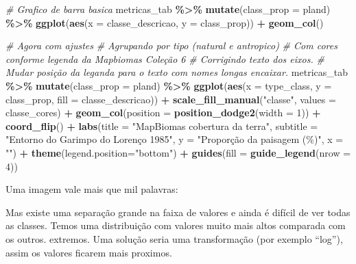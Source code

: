 \documentclass[
]{article}
\newenvironment{Shaded}{\begin{snugshade}}{\end{snugshade}}
\newcommand{\AttributeTok}[1]{\textcolor[rgb]{0.13,0.29,0.53}{#1}}
\newcommand{\CommentTok}[1]{\textcolor[rgb]{0.56,0.35,0.01}{\textit{#1}}}
\newcommand{\DecValTok}[1]{\textcolor[rgb]{0.00,0.00,0.81}{#1}}
\newcommand{\FunctionTok}[1]{\textcolor[rgb]{0.13,0.29,0.53}{\textbf{#1}}}
\newcommand{\NormalTok}[1]{#1}
\newcommand{\SpecialCharTok}[1]{\textcolor[rgb]{0.81,0.36,0.00}{\textbf{#1}}}
\newcommand{\StringTok}[1]{\textcolor[rgb]{0.31,0.60,0.02}{#1}}
\begin{document}
\begin{Shaded}
\begin{Highlighting}[]
\CommentTok{\# Grafico de barra basica}
\NormalTok{metricas\_tab }\SpecialCharTok{\%\textgreater{}\%} 
\FunctionTok{mutate}\NormalTok{(}\AttributeTok{class\_prop =}\NormalTok{ pland) }\SpecialCharTok{\%\textgreater{}\%} 
\FunctionTok{ggplot}\NormalTok{(}\FunctionTok{aes}\NormalTok{(}\AttributeTok{x =}\NormalTok{ classe\_descricao, }\AttributeTok{y =}\NormalTok{ class\_prop)) }\SpecialCharTok{+}
\FunctionTok{geom\_col}\NormalTok{()}


\CommentTok{\# Agora com ajustes}
\CommentTok{\# Agrupando por tipo (natural e antropico)}
\CommentTok{\# Com cores conforme legenda da Mapbiomas Coleção 6}
\CommentTok{\# Corrigindo texto dos eixos.}
\CommentTok{\# Mudar posição da leganda para o texto com nomes longas encaixar.}
\NormalTok{metricas\_tab }\SpecialCharTok{\%\textgreater{}\%} 
\FunctionTok{mutate}\NormalTok{(}\AttributeTok{class\_prop =}\NormalTok{ pland) }\SpecialCharTok{\%\textgreater{}\%} 
\FunctionTok{ggplot}\NormalTok{(}\FunctionTok{aes}\NormalTok{(}\AttributeTok{x =}\NormalTok{ type\_class, }\AttributeTok{y =}\NormalTok{ class\_prop, }
\AttributeTok{fill =}\NormalTok{ classe\_descricao)) }\SpecialCharTok{+} 
\FunctionTok{scale\_fill\_manual}\NormalTok{(}\StringTok{"classe"}\NormalTok{, }\AttributeTok{values =}\NormalTok{ classe\_cores) }\SpecialCharTok{+}
\FunctionTok{geom\_col}\NormalTok{(}\AttributeTok{position =} \FunctionTok{position\_dodge2}\NormalTok{(}\AttributeTok{width =} \DecValTok{1}\NormalTok{)) }\SpecialCharTok{+} 
\FunctionTok{coord\_flip}\NormalTok{() }\SpecialCharTok{+} 
\FunctionTok{labs}\NormalTok{(}\AttributeTok{title =} \StringTok{"MapBiomas cobertura da terra"}\NormalTok{, }
\AttributeTok{subtitle =} \StringTok{"Entorno do Garimpo do Lorenço 1985"}\NormalTok{,}
\AttributeTok{y =} \StringTok{"Proporção da paisagem (\%)"}\NormalTok{, }
\AttributeTok{x =} \StringTok{""}\NormalTok{) }\SpecialCharTok{+} 
\FunctionTok{theme}\NormalTok{(}\AttributeTok{legend.position=}\StringTok{"bottom"}\NormalTok{) }\SpecialCharTok{+} 
\FunctionTok{guides}\NormalTok{(}\AttributeTok{fill =} \FunctionTok{guide\_legend}\NormalTok{(}\AttributeTok{nrow =} \DecValTok{4}\NormalTok{))}
\end{Highlighting}
\end{Shaded}

Uma imagem vale mais que mil palavras:

Mas existe uma separação grande na faixa de valores e ainda é
difícil de ver todas as classes. Temos uma distribuição com valores
muito mais altos comparada com os outros.
extremos. Uma solução seria uma transformação (por exemplo ``log''),
assim os valores ficarem mais proximos.
\end{document}
